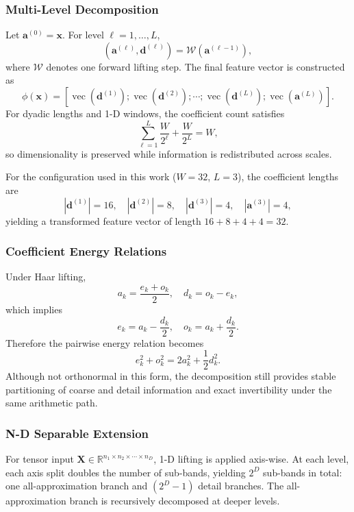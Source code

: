 \documentclass[journal]{IEEEtran}
\begin{document}
\subsubsection{Multi-Level Decomposition}
Let $\mathbf{a}^{(0)}=\mathbf{x}$. For level $\ell=1,\ldots,L$,
\begin{equation}
(\mathbf{a}^{(\ell)},\mathbf{d}^{(\ell)})=\mathcal{W}(\mathbf{a}^{(\ell-1)}),
\end{equation}
where $\mathcal{W}$ denotes one forward lifting step. The final feature vector is constructed as
\begin{equation}
\phi(\mathbf{x})=
\left[
\operatorname{vec}(\mathbf{d}^{(1)});
\operatorname{vec}(\mathbf{d}^{(2)});
\cdots;
\operatorname{vec}(\mathbf{d}^{(L)});
\operatorname{vec}(\mathbf{a}^{(L)})
\right].
\end{equation}
For dyadic lengths and 1-D windows, the coefficient count satisfies
\begin{equation}
\sum_{\ell=1}^{L}\frac{W}{2^{\ell}}+\frac{W}{2^{L}}=W,
\end{equation}
so dimensionality is preserved while information is redistributed across scales.

For the configuration used in this work ($W=32$, $L=3$), the coefficient lengths are
\begin{equation}
|\mathbf{d}^{(1)}|=16,\quad |\mathbf{d}^{(2)}|=8,\quad |\mathbf{d}^{(3)}|=4,\quad |\mathbf{a}^{(3)}|=4,
\end{equation}
yielding a transformed feature vector of length $16+8+4+4=32$.

\subsubsection{Coefficient Energy Relations}
Under Haar lifting,
\begin{equation}
a_k=\frac{e_k+o_k}{2},\quad d_k=o_k-e_k,
\end{equation}
which implies
\begin{equation}
e_k=a_k-\frac{d_k}{2},\quad o_k=a_k+\frac{d_k}{2}.
\end{equation}
Therefore the pairwise energy relation becomes
\begin{equation}
e_k^2+o_k^2=2a_k^2+\frac{1}{2}d_k^2.
\end{equation}
Although not orthonormal in this form, the decomposition still provides stable partitioning of coarse and detail information and exact invertibility under the same arithmetic path.

\subsubsection{N-D Separable Extension}
For tensor input $\mathbf{X}\in\mathbb{R}^{n_1\times n_2\times\cdots\times n_D}$, 1-D lifting is applied axis-wise. At each level, each axis split doubles the number of sub-bands, yielding $2^D$ sub-bands in total: one all-approximation branch and $(2^D-1)$ detail branches. The all-approximation branch is recursively decomposed at deeper levels.
\end{document}

